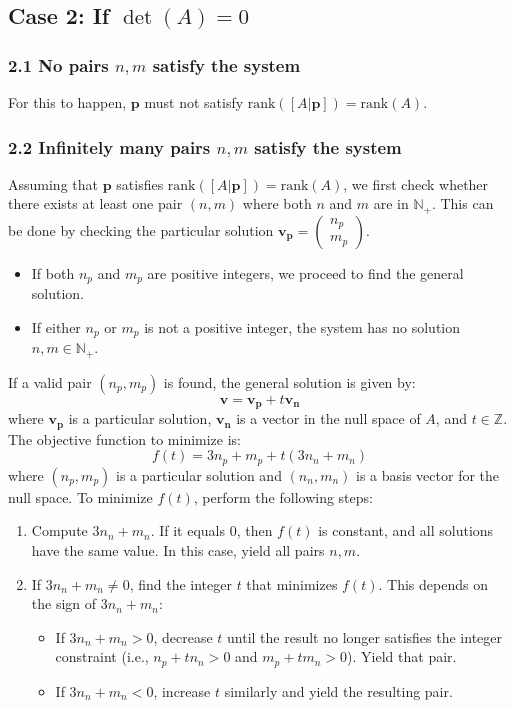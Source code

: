 \documentclass{article}
\begin{document}
\subsection*{Case 2: If \( \det(A) = 0 \)}

\subsubsection*{2.1 No pairs \( n, m \) satisfy the system}

For this to happen, \( \mathbf{p} \) must not satisfy \( \text{rank}([A | \mathbf{p}]) = \text{rank}(A) \).

\subsubsection*{2.2 Infinitely many pairs \( n, m \) satisfy the system}

Assuming that \( \mathbf{p} \) satisfies \( \text{rank}([A | \mathbf{p}]) = \text{rank}(A) \), we first check whether there exists at least one pair \( (n, m) \) where both \( n \) and \( m \) are in \( \mathbb{N}_+ \). This can be done by checking the particular solution \( \mathbf{v_p} = \begin{pmatrix} n_p \\ m_p \end{pmatrix} \).
\begin{itemize}
    \item If both \( n_p \) and \( m_p \) are positive integers, we proceed to find the general solution.
    \item If either \( n_p \) or \( m_p \) is not a positive integer, the system has no solution \( n,m \in \mathbb{N}_+ \).
\end{itemize}
If a valid pair \( (n_p, m_p) \) is found, the general solution is given by:
\[
\mathbf{v} = \mathbf{v_p} + t\mathbf{v_n}
\]
where \( \mathbf{v_p} \) is a particular solution, \( \mathbf{v_n} \) is a vector in the null space of \( A \), and \( t \in \mathbb{Z} \).
The objective function to minimize is:
\[
f(t) = 3n_p + m_p + t(3n_n + m_n)
\]
where \( (n_p, m_p) \) is a particular solution and \( (n_n, m_n) \) is a basis vector for the null space.
To minimize \( f(t) \), perform the following steps:

\begin{enumerate}
    \item Compute \( 3n_n + m_n \). If it equals 0, then \( f(t) \) is constant, and all solutions have the same value. In this case, yield all pairs \( n,m \).
    
    \item If \( 3n_n + m_n \neq 0 \), find the integer \( t \) that minimizes \( f(t) \). This depends on the sign of \( 3n_n + m_n \):
    \begin{itemize}
        \item If \( 3n_n + m_n > 0 \), decrease \( t \) until the result no longer satisfies the integer constraint (i.e., \( n_p + t n_n > 0 \) and \( m_p + t m_n > 0 \)). Yield that pair.
        \item If \( 3n_n + m_n < 0 \), increase \( t \) similarly and yield the resulting pair.
    \end{itemize}
\end{enumerate}
\end{document}

